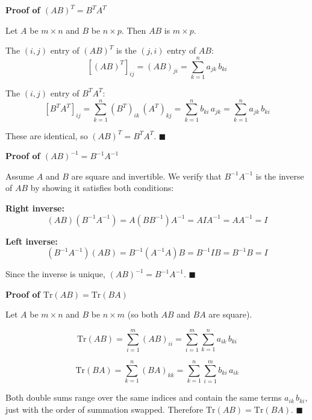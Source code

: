 \documentclass[12pt]{article}
\begin{document}
\begin{stepbox}
\textbf{Proof of $(AB)^T = B^T A^T$}

Let $A$ be $m \times n$ and $B$ be $n \times p$. Then $AB$ is $m \times p$.

The $(i,j)$ entry of $(AB)^T$ is the $(j,i)$ entry of $AB$:
\[
[(AB)^T]_{ij} = (AB)_{ji} = \sum_{k=1}^{n} a_{jk}\, b_{ki}
\]

The $(i,j)$ entry of $B^T A^T$:
\[
[B^T A^T]_{ij} = \sum_{k=1}^{n} (B^T)_{ik}\, (A^T)_{kj} = \sum_{k=1}^{n} b_{ki}\, a_{jk} = \sum_{k=1}^{n} a_{jk}\, b_{ki}
\]

These are identical, so $(AB)^T = B^T A^T$. \hfill $\blacksquare$
\end{stepbox}

\begin{stepbox}
\textbf{Proof of $(AB)^{-1} = B^{-1} A^{-1}$}

Assume $A$ and $B$ are square and invertible. We verify that $B^{-1}A^{-1}$ is the inverse of $AB$ by showing it satisfies both conditions:

\textbf{Right inverse:}
\[
(AB)(B^{-1}A^{-1}) = A(BB^{-1})A^{-1} = AIA^{-1} = AA^{-1} = I
\]

\textbf{Left inverse:}
\[
(B^{-1}A^{-1})(AB) = B^{-1}(A^{-1}A)B = B^{-1}IB = B^{-1}B = I
\]

Since the inverse is unique, $(AB)^{-1} = B^{-1}A^{-1}$. \hfill $\blacksquare$
\end{stepbox}

\begin{stepbox}
\textbf{Proof of $\mathrm{Tr}(AB) = \mathrm{Tr}(BA)$}

Let $A$ be $m \times n$ and $B$ be $n \times m$ (so both $AB$ and $BA$ are square).

\[
\mathrm{Tr}(AB) = \sum_{i=1}^{m} (AB)_{ii} = \sum_{i=1}^{m} \sum_{k=1}^{n} a_{ik}\, b_{ki}
\]

\[
\mathrm{Tr}(BA) = \sum_{k=1}^{n} (BA)_{kk} = \sum_{k=1}^{n} \sum_{i=1}^{m} b_{ki}\, a_{ik}
\]

Both double sums range over the same indices and contain the same terms $a_{ik}\, b_{ki}$, just with the order of summation swapped. Therefore $\mathrm{Tr}(AB) = \mathrm{Tr}(BA)$. \hfill $\blacksquare$
\end{stepbox}

\end{document}
